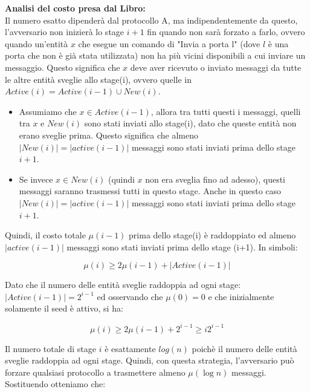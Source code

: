 \textbf{Analisi del costo presa dal Libro:}\\
Il numero esatto dipenderà dal protocollo A, ma indipendentemente da questo, l'avversario non inizierà lo stage $i+1$ fin quando non sarà forzato a farlo, ovvero quando un'entità $x$ che esegue un comando di "Invia a porta l" (dove $l$ è una porta che non è già stata utilizzata) non ha più vicini disponibili a cui inviare un messaggio. Questo significa che $x$ deve aver ricevuto o inviato messaggi da tutte le altre entità sveglie allo stage(i), ovvero quelle in $Active(i) = Active(i-1) \cup New (i)$.
 
 \begin{itemize}
     \item Assumiamo che $x \in Active(i-1)$, allora tra tutti questi i messaggi, quelli tra $x$ e $New(i)$ sono stati inviati allo stage(i), dato che queste entità non erano sveglie prima. Questo significa che almeno $|New(i)|=|active(i-1)|$ messaggi sono stati inviati prima dello stage $i+1$.
     \item Se invece $x \in New(i)$ (quindi $x$ non era sveglia fino ad adesso), questi messaggi saranno trasmessi tutti in questo stage. Anche in questo caso $|New(i)|=|active(i-1)|$ messaggi sono stati inviati prima dello stage $i+1$.
 \end{itemize} 
 
 Quindi, il costo totale $\mu(i-1)$ prima dello stage(i) è raddoppiato ed almeno $|active(i-1)|$ messaggi sono stati inviati prima dello stage (i+1). In simboli:

 
 $$\mu(i) \geq 2\mu(i-1) + |Active(i-1)|$$
 
 Dato che il numero delle entità sveglie raddoppia ad ogni stage: $|Active(i-1)| = 2^{i-1}$ ed osservando che $\mu(0) = 0$ e che inizialmente solamente il seed è attivo, si ha:
 
 $$\mu(i) \geq 2\mu(i-1)+2^{i-1} \geq i2^{i-1}$$
 
 Il numero totale di stage $i$ è esattamente $log(n)$ poichè il numero delle entità sveglie raddoppia ad ogni stage. Quindi, con questa strategia, l'avversario può forzare qualsiasi protocollo a trasmettere almeno $\mu(\log n)$ messaggi. Sostituendo otteniamo che:
 
